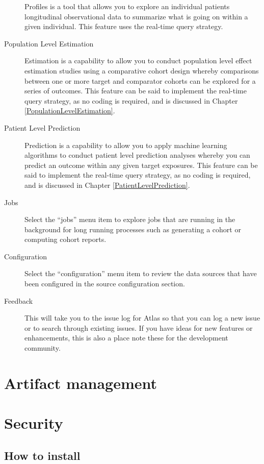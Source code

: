 \documentclass[11pt]{book}
\begin{document}
\begin{description}
Profiles is a tool that allows you to explore an individual patients
longitudinal observational data to summarize what is going on within a
given individual. This feature uses the real-time query strategy.
\item[Population Level Estimation]
Estimation is a capability to allow you to conduct population level
effect estimation studies using a comparative cohort design whereby
comparisons between one or more target and comparator cohorts can be
explored for a series of outcomes. This feature can be said to implement
the real-time query strategy, as no coding is required, and is discussed
in Chapter \ref{PopulationLevelEstimation}.
\item[Patient Level Prediction]
Prediction is a capability to allow you to apply machine learning
algorithms to conduct patient level prediction analyses whereby you can
predict an outcome within any given target exposures. This feature can
be said to implement the real-time query strategy, as no coding is
required, and is discussed in Chapter \ref{PatientLevelPrediction}.
\item[Jobs]
Select the ``jobs'' menu item to explore jobs that are running in the
background for long running processes such as generating a cohort or
computing cohort reports.
\item[Configuration]
Select the ``configuration'' menu item to review the data sources that
have been configured in the source configuration section.
\item[Feedback]
This will take you to the issue log for Atlas so that you can log a new
issue or to search through existing issues. If you have ideas for new
features or enhancements, this is also a place note these for the
development community.
\end{description}

\section{Artifact management}\label{artifact-management}

\section{Security}\label{security}

\subsection{How to install}\label{how-to-install}
\end{document}
